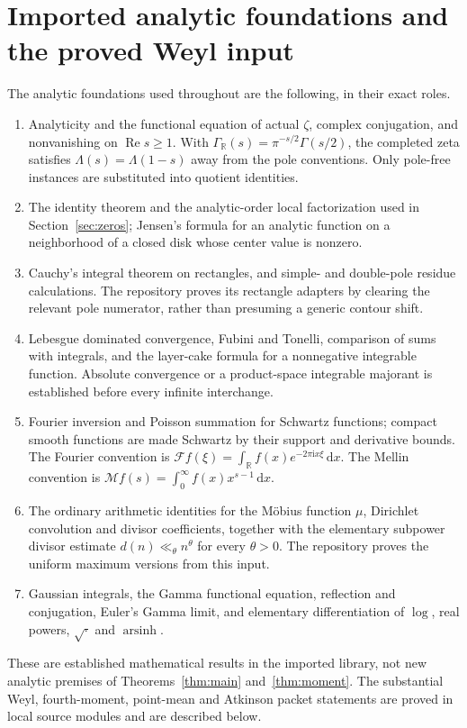 \documentclass[11pt,a4paper]{article}
\numberwithin{equation}{section}
\theoremstyle{definition}
\newcommand{\R}{\mathbb R}
\newcommand{\dd}{\,\mathrm d}
\newcommand{\ii}{\mathrm i}
\newcommand{\Rea}{\operatorname{Re}}
\newcommand{\arsinh}{\operatorname{arsinh}}
\newcommand{\Mell}{\mathcal M}
\newcommand{\FT}{\mathcal F}
\begin{document}
\section{Imported analytic foundations and the proved Weyl input}
\label{sec:foundations}
The analytic foundations used throughout are the following, in their exact roles.
\begin{enumerate}
\item Analyticity and the functional equation of actual $\zeta$, complex
conjugation, and nonvanishing on $\Rea s\ge1$.
With $\Gamma_{\R}(s)=\pi^{-s/2}\Gamma(s/2)$, the completed zeta satisfies
$\Lambda(s)=\Lambda(1-s)$ away from the pole conventions. Only pole-free
instances are substituted into quotient identities.
\item The identity theorem and the analytic-order local factorization used in
Section~\ref{sec:zeros}; Jensen's formula for an analytic function on a
neighborhood of a closed disk whose center value is nonzero.
\item Cauchy's integral theorem on rectangles, and simple- and double-pole
residue calculations. The repository proves its rectangle adapters by clearing
the relevant pole numerator, rather than presuming a generic contour shift.
\item Lebesgue dominated convergence, Fubini and Tonelli, comparison of sums
with integrals, and the layer-cake formula for a nonnegative integrable
function. Absolute convergence or a product-space integrable majorant is
established before every infinite interchange.
\item Fourier inversion and Poisson summation for Schwartz functions; compact
smooth functions are made Schwartz by their support and derivative bounds.
The Fourier convention is $\FT f(\xi)=\int_{\R}f(x)e^{-2\pi\ii x\xi}\dd x$.
The Mellin convention is $\Mell f(s)=\int_0^\infty f(x)x^{s-1}\dd x$.
\item The ordinary arithmetic identities for the M\"obius function $\mu$,
Dirichlet convolution and divisor coefficients, together with the elementary
subpower divisor estimate $d(n)\ll_\theta n^\theta$ for every $\theta>0$.
The repository proves the uniform maximum versions from this input.
\item Gaussian integrals, the Gamma functional equation, reflection and
conjugation, Euler's Gamma limit, and elementary differentiation of $\log$,
real powers, $\sqrt{\cdot}$ and $\arsinh$.
\end{enumerate}
These are established mathematical results in the imported library, not new
analytic premises of Theorems~\ref{thm:main} and~\ref{thm:moment}.
The substantial Weyl, fourth-moment, point-mean and Atkinson packet statements
are proved in local source modules and are described below.
\end{document}
